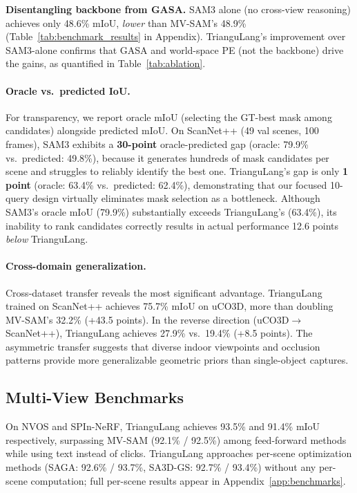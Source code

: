\textbf{Disentangling backbone from GASA.} SAM3 alone (no cross-view reasoning) achieves only 48.6\% mIoU, \emph{lower} than MV-SAM's 48.9\% (Table~\ref{tab:benchmark_results} in Appendix). TrianguLang's improvement over SAM3-alone confirms that GASA and world-space PE (not the backbone) drive the gains, as quantified in Table~\ref{tab:ablation}.

\paragraph{Oracle vs.\ predicted IoU.}
For transparency, we report oracle mIoU (selecting the GT-best mask among candidates) alongside predicted mIoU. On ScanNet++ (49 val scenes, 100 frames), SAM3 exhibits a \textbf{30-point} oracle-predicted gap (oracle: 79.9\% vs.\ predicted: 49.8\%), because it generates hundreds of mask candidates per scene and struggles to reliably identify the best one. TrianguLang's gap is only \textbf{1 point} (oracle: 63.4\% vs.\ predicted: 62.4\%), demonstrating that our focused 10-query design virtually eliminates mask selection as a bottleneck. Although SAM3's oracle mIoU (79.9\%) substantially exceeds TrianguLang's (63.4\%), its inability to rank candidates correctly results in actual performance 12.6 points \emph{below} TrianguLang.

\paragraph{Cross-domain generalization.}
Cross-dataset transfer reveals the most significant advantage. TrianguLang trained on ScanNet++ achieves 75.7\% mIoU on uCO3D, more than doubling MV-SAM's 32.2\% (+43.5 points). In the reverse direction (uCO3D$\to$ScanNet++), TrianguLang achieves 27.9\% vs.\ 19.4\% (+8.5 points). The asymmetric transfer suggests that diverse indoor viewpoints and occlusion patterns provide more generalizable geometric priors than single-object captures.

\subsection{Multi-View Benchmarks}

On NVOS and SPIn-NeRF, TrianguLang achieves 93.5\% and 91.4\% mIoU respectively, surpassing MV-SAM (92.1\% / 92.5\%) among feed-forward methods while using text instead of clicks. TrianguLang approaches per-scene optimization methods (SAGA: 92.6\% / 93.7\%, SA3D-GS: 92.7\% / 93.4\%) without any per-scene computation; full per-scene results appear in Appendix~\ref{app:benchmarks}.

